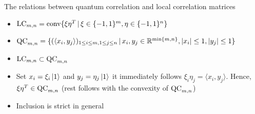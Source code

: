 \begin{frame}{The relations between quantum correlation and local correlation matrices}
	\begin{itemize}
		\item<1->{\footnotesize  $ \textup{LC}_{m,n} = \textup{conv} \{  \xi\eta^T \, | \, \xi \in \{-1,1\}^m, \eta \in \{-1,1\}^n     \} $}
		\item<1-> {\footnotesize $ \textup{QC}_{m,n} = \{ (\langle x_i,y_j \rangle)_{1 \le i \le m, 1 \le j \le n} \,| \, x_i,y_j \in \mathbb{R}^{ \min \{m,n \} }, \vert x_i  \vert \le 1, \vert y_j \vert \le 1  \} $ }
		\item<1-> $ \textup{LC}_{m,n} \subset \textup{QC}_{m,n} $
		\item<2-> Set $ x_i = \xi_i \ket{1}$ and $ y_j = \eta_j\ket{1} $ it immediately follows  $ \xi_i\eta_j = \langle x_i, y_j \rangle $. Hence, $ \xi\eta^T \in \textup{QC}_{m,n} $ (rest follows with the convexity of $ \textup{QC}_{m,n} $)
		\item<3-> Inclusion is strict in general 
	\end{itemize}
\end{frame}

